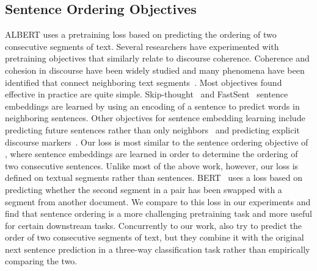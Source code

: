 \subsection{Sentence Ordering Objectives}
ALBERT uses a pretraining loss based on predicting the ordering of two consecutive segments of text. Several researchers have experimented with pretraining objectives that similarly relate to discourse coherence. 
Coherence and cohesion in discourse have been widely studied and many phenomena have been identified that connect neighboring text segments~\citep{DBLP:journals/cogsci/Hobbs79,halliday-76,grosz-etal-1995-centering}. 
Most objectives found effective in practice are quite simple. 
Skip-thought~\citep{Kiros2015skipthought} and FastSent~\citep{hill2016fastsent} sentence embeddings are learned by using an encoding of a sentence to predict words in neighboring sentences. 
Other objectives for sentence embedding learning include predicting future sentences rather than only neighbors~\citep{gan-etal-2017-learning} and predicting explicit discourse markers~\citep{jernite2017discourse,nie-etal-2019-dissent}. 
Our loss is most similar to the sentence ordering objective of \citet{jernite2017discourse}, where sentence embeddings are learned in order to determine the ordering of two consecutive sentences. 
Unlike most of the above work, however, our loss is defined on textual segments rather than sentences. BERT~\citep{devlin2018bert} uses a loss based on predicting whether the second segment in a pair has been swapped with a segment from another document.
We compare to this loss in our experiments and find that sentence ordering is a more challenging pretraining task and more useful for certain downstream tasks.
Concurrently to our work, \cite{wang2019structbert} also try to predict the order of two consecutive segments of text, but they combine it with the original next sentence prediction in a three-way classification task rather than empirically comparing the two. 
